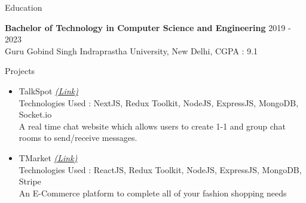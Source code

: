\documentclass{resume} %
\begin{document}

\begin{rSection}{Education}

{\bf Bachelor of Technology in Computer Science and Engineering} \hfill {2019 - 2023}
\\ 
{\normalfont Guru Gobind Singh Indraprastha University, New Delhi}, {\normalfont CGPA : 9.1} 


\end{rSection}
 


\begin{rSection}{Projects}
   \begin{itemize}

    \item TalkSpot
   \href{https://github.com/tushargahlaut/talkspot-chat-app}{\emph{(Link)}} 
   \\Technologies Used : NextJS, Redux Toolkit, NodeJS, ExpressJS, MongoDB, Socket.io 
   \\{\normalfont A real time chat website which allows users to create 1-1 and group chat rooms to send/receive messages.}
   
   \item TMarket
   \href{https://github.com/tushargahlaut/TMarket}{\emph{(Link)}}
   \\Technologies Used : ReactJS, Redux Toolkit, NodeJS, ExpressJS, MongoDB, Stripe
   \\{\normalfont An E-Commerce platform to complete all of your fashion shopping needs}
   
   \end{itemize}
\end{rSection}
\end{document}
